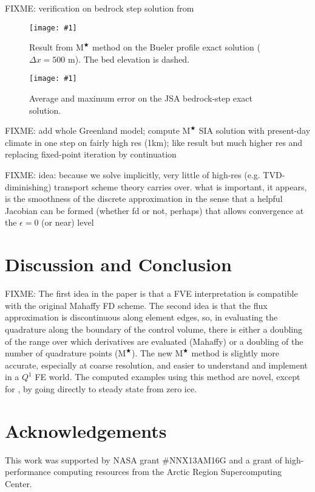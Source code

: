 \documentclass[twocolumn,letterpaper]{igs}
\newcommand{\onecol}[1]{\texttt{[image: \#1]}}
\newcommand\eps{\epsilon}
\newcommand{\Mstar}{$\text{M}^{\bigstar}$\xspace}
\begin{document}
FIXME: verification on bedrock step solution from \cite{JaroschSchoofAnslow2013}

\begin{figure}[ht]
\onecol{bedstepprofile.pdf}
\caption{Result from \Mstar method on the Bueler profile exact solution ($\Delta x=500$ m).  The bed elevation is dashed.}
\label{fig:bedstepprofile}
\end{figure}

\begin{figure}[ht]
\onecol{bedstepverif.pdf}
\caption{Average and maximum error on the JSA bedrock-step exact solution.}
\label{fig:bedstepverif}
\end{figure}

FIXME: add whole Greenland model; compute \Mstar SIA solution with present-day climate in one step on fairly high res (1km); like \cite{JouvetBueler2012} result but much higher res and replacing fixed-point iteration by continuation 

FIXME: idea: because we solve implicitly, very little of high-res (e.g. TVD-diminishing) transport scheme theory carries over.  what is important, it appears, is the smoothness of the discrete approximation in the sense that a helpful Jacobian can be formed (whether fd or not, perhaps) that allows convergence at the $\eps=0$ (or near) level


\section{Discussion and Conclusion} \label{sec:conclusion}

FIXME: The first idea in the paper is that a FVE interpretation is compatible with the original Mahaffy FD scheme.  The second idea is that the flux approximation is discontinuous along element edges, so, in evaluating the quadrature along the boundary of the control volume, there is either a doubling of the range over which derivatives are evaluated (Mahaffy) or a doubling of the number of quadrature points (\Mstar).  The new \Mstar method is slightly more accurate, especially at coarse resolution, and easier to understand and implement in a $Q^1$ FE world.  The computed examples using this method are novel, except for \cite{JouvetBueler2012}, by going directly to steady state from zero ice.

\section*{Acknowledgements}
This work was supported by NASA grant \#NNX13AM16G and a grant of high-performance computing resources from the Arctic Region Supercomputing Center.
\end{document}
